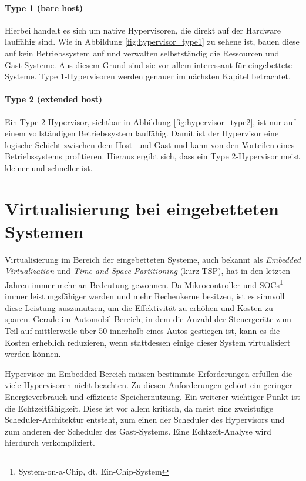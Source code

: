 \documentclass[
  a4paper,					    %
  twoside,
  DIV=calc,     				%
  bibliography=totoc,
  cleardoublepage=empty,
  ngerman,     					%
  final       					%
]{scrbook}
\begin{document}
\paragraph{Type 1 (bare host)} Hierbei handelt es sich um native Hypervisoren, die direkt auf der Hardware lauffähig sind. Wie in Abbildung \ref{fig:hypervisor_type1} zu sehene ist, bauen diese auf kein Betriebssystem auf und verwalten selbstständig die Ressourcen und Gast-Systeme. Aus diesem Grund sind sie vor allem interessant für eingebettete Systeme. Type 1-Hypervisoren werden genauer im nächsten Kapitel betrachtet.

\paragraph{Type 2 (extended host)} Ein Type 2-Hypervisor, sichtbar in Abbildung \ref{fig:hypervisor_type2}, ist nur auf einem vollständigen Betriebssystem lauffähig. Damit ist der Hypervisor eine logische Schicht zwischen dem Host- und Gast und kann von den Vorteilen eines Betriebssystems profitieren. Hieraus ergibt sich, dass ein Type 2-Hypervisor meist kleiner und schneller ist.





\section{Virtualisierung bei eingebetteten Systemen}
\label{sec:EVirtualisierung}
Virtualisierung im Bereich der eingebetteten Systeme, auch bekannt als \emph{Embedded Virtualization} und \emph{Time and Space Partitioning} (kurz TSP), hat in den letzten Jahren immer mehr an Bedeutung gewonnen. Da Mikrocontroller und SOCs\footnote{System-on-a-Chip, dt. Ein-Chip-System} immer leistungsfähiger werden und mehr Rechenkerne besitzen, ist es sinnvoll diese Leistung auszunutzen, um die Effektivität zu erhöhen und Kosten zu sparen. Gerade im Automobil-Bereich, in dem die Anzahl der Steuergeräte zum Teil auf mittlerweile über 50 innerhalb eines Autos gestiegen ist, kann es die Kosten erheblich reduzieren, wenn stattdessen einige dieser System virtualisiert werden können.

Hypervisor im Embedded-Bereich müssen bestimmte Erforderungen erfüllen die viele Hypervisoren nicht beachten. Zu diesen Anforderungen gehört ein geringer Energieverbrauch und effiziente Speichernutzung. Ein weiterer wichtiger Punkt ist die Echtzeitfähigkeit. Diese ist vor allem kritisch, da meist eine zweistufige Scheduler-Architektur entsteht, zum einen der Scheduler des Hypervisors und zum anderen der Scheduler des Gast-Systems. Eine Echtzeit-Analyse wird hierdurch verkompliziert.\cite{two_lvl_sched}
\end{document}
